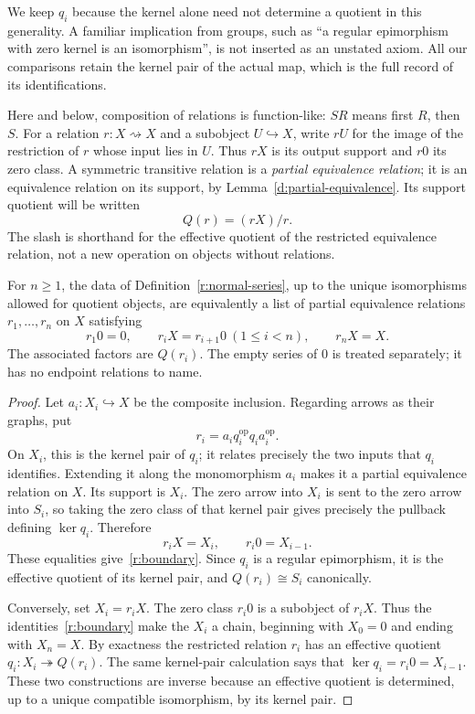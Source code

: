We keep $q_i$ because the kernel alone need not determine a quotient in
this generality.  A familiar implication from groups, such as ``a regular
epimorphism with zero kernel is an isomorphism'', is not inserted as an
unstated axiom.  All our comparisons retain the kernel pair of the actual
map, which is the full record of its identifications.

Here and below, composition of relations is function-like: $SR$ means
first $R$, then $S$.  For a relation $r:X\rightsquigarrow X$ and a subobject
$U\hookrightarrow X$, write $rU$ for the image of the restriction of $r$
whose input lies in $U$.  Thus $rX$ is its output support and $r0$ its zero
class.  A symmetric transitive relation is a \emph{partial equivalence
relation}; it is an equivalence relation on its support, by
Lemma~\ref{d:partial-equivalence}.  Its support quotient will be written
\[
                    Q(r)=(rX)/r.
\]
The slash is shorthand for the effective quotient of the restricted
equivalence relation, not a new operation on objects without relations.

\begin{lemma}
\label{r:series-relations}
For $n\geq1$, the data of Definition~\ref{r:normal-series}, up to the unique isomorphisms
allowed for quotient objects, are equivalently a list of partial equivalence
relations $r_1,\ldots,r_n$ on $X$ satisfying
\begin{equation}
\label{r:boundary}
 r_1 0=0,\qquad r_iX=r_{i+1}0\ (1\leq i<n),\qquad r_nX=X.
\end{equation}
The associated factors are $Q(r_i)$. The empty series of $0$ is treated
separately; it has no endpoint relations to name.
\end{lemma}

\begin{proof}
Let $a_i:X_i\hookrightarrow X$ be the composite inclusion.  Regarding
arrows as their graphs, put
\[
       r_i=a_iq_i^{\mathrm{op}}q_i a_i^{\mathrm{op}}.
\]
On $X_i$, this is the kernel pair of $q_i$; it relates precisely the two
inputs that $q_i$ identifies.  Extending it along the monomorphism $a_i$
makes it a partial equivalence relation on $X$.  Its support is $X_i$.
The zero arrow into $X_i$ is sent to the zero arrow into $S_i$, so taking
the zero class of that kernel pair gives precisely the pullback defining
$\ker q_i$.  Therefore
\[
                 r_iX=X_i,\qquad r_i0=X_{i-1}.
\]
These equalities give~\eqref{r:boundary}.  Since $q_i$ is a regular
epimorphism, it is the effective quotient of its kernel pair, and
$Q(r_i)\cong S_i$ canonically.

Conversely, set $X_i=r_iX$.  The zero class $r_i0$ is a subobject of $r_iX$.
Thus the identities~\eqref{r:boundary} make the $X_i$ a chain, beginning
with $X_0=0$ and ending with $X_n=X$.  By exactness the restricted relation
$r_i$ has an effective quotient $q_i:X_i\twoheadrightarrow Q(r_i)$.
The same kernel-pair calculation says that $\ker q_i=r_i0=X_{i-1}$.
These two constructions are inverse because an effective quotient is
determined, up to a unique compatible isomorphism, by its kernel pair.
\end{proof}

